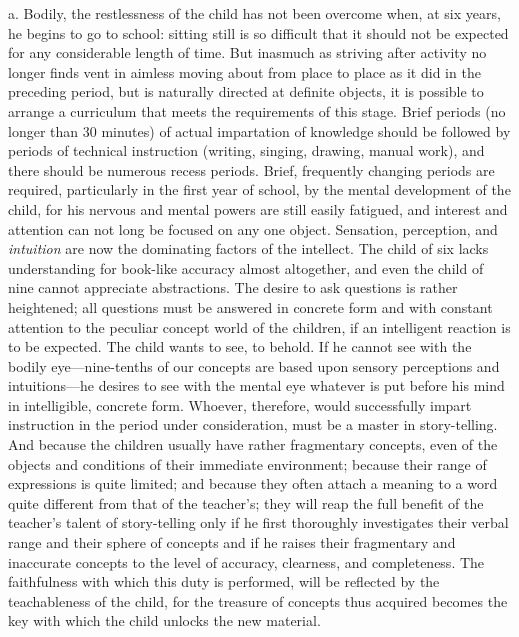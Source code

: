 a. Bodily, the restlessness of the child has not been overcome when, at six years, he begins to go to school: sitting still is so difficult that it should not be expected for any considerable length of time. But inasmuch as striving after activity no longer finds vent in aimless moving about from place to place as it did in the preceding period, but is naturally directed at definite objects, it is possible to arrange a curriculum
that meets the requirements of this stage. Brief periods (no longer than 30 minutes) of actual impartation of knowledge should be followed by periods of technical instruction (writing, singing, drawing, manual work), and there should be numerous recess periods. Brief, frequently changing periods are required, particularly in the first year of school, by the mental development of the child, for his nervous and mental powers are still easily fatigued, and interest and attention can not long be focused on any one object. Sensation, perception, and \emph{intuition} are now the dominating factors of the intellect. The child of six lacks understanding for book-like accuracy almost altogether, and even the child of nine cannot appreciate abstractions. The desire to ask questions is rather heightened; all questions must be answered in concrete form and with constant attention to the peculiar concept world of the children, if an intelligent reaction is to be expected. The child wants to see, to behold. If he cannot see with the bodily eye—nine-tenths of our concepts are based upon sensory perceptions and intuitions—he desires to see with the mental eye whatever is put before his mind in intelligible, concrete form. Whoever, therefore, would successfully impart instruction in the period under consideration, must be a master in story-telling. And because the children usually have rather fragmentary concepts, even of the objects and conditions of their immediate environment; because their range of expressions is quite limited; and because they often attach a meaning to a word quite different from that of the teacher's; they will reap the full benefit of the teacher's talent of story-telling only if he first thoroughly investigates their verbal range and their sphere of concepts and if he raises their fragmentary and inaccurate concepts to the level of accuracy, clearness, and completeness. The faithfulness with which this duty is performed, will be reflected by the teachableness of the child, for the treasure
of concepts thus acquired becomes the key with which the child unlocks the new material.

